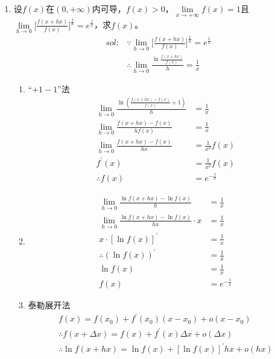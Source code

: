 \begin{enumerate}[{例}1.]
    \item 设$f(x)$在$(0,+\infty)$内可导，$f(x)>0$，$\lim\limits_{x\to{+\infty}}f(x)=1$且$\lim\limits_{h\to0}\bigg[\frac{f(x+hx)}{f(x)}\bigg]^\frac{1}{h}=e^\frac{1}{x}$，求$f(x)$。
        \begin{align*}
            sol:&\because \lim_{h \to 0}\bigg[\frac{f(x+hx)}{f(x)}\bigg]^{\frac{1}{h}}=e^{\frac{1}{x}}\\
            &\therefore \lim_{h \to 0}\frac{\ln \frac{f(x+hx)}{f(x)}}{h}=\frac{1}{x}
        \end{align*}
        \begin{enumerate}[$1^\circ$]
            \item ``$+1-1$''法
                \begin{align*}
                    \lim_{h \to 0}\frac{\ln(\frac{f(x+hx)-f(x)}{f(x)}+1)}{h}&=\frac{1}{x}\\
                    \lim_{h \to 0}\frac{f(x+hx)-f(x)}{hf(x)}&=\frac{1}{x}\\
                    \lim_{h \to 0}\frac{f(x+hx)-f(x)}{hx}&=\frac{1}{x^2}f(x)\\
                    f^{\prime}(x)&=\frac{1}{x^2}f(x)\\
                    \therefore f(x)&=e^{-\frac{1}{x}}
                \end{align*}
            \item 
                \begin{align*}
                    \lim_{h \to 0} \frac{\ln f(x+hx)-\ln f(x)}{h}&=\frac{1}{x}\\
                    \lim_{h \to 0} \frac{\ln f(x+hx)-\ln f(x)}{hx}\cdot x&=\frac{1}{x}\\
                    x\cdot[\ln f(x)]^{\prime}&=\frac{1}{x}\\
                    \therefore (\ln f(x))^{\prime}&=\frac{1}{x}\\
                    \ln f(x)&=\frac{1}{x}\\
                    f(x)&=e^{-\frac{1}{x}}
                \end{align*}
            \item 泰勒展开法
                \begin{align*}
                    f(x)=f(x_0)+f^{\prime}(x_0)(x-x_0)+o(x-x_0)\\
                    \therefore f(x+\Delta x)=f(x)+f^{\prime}(x)\Delta x+o(\Delta x)\\
                    \therefore \ln f(x+hx)=\ln f(x)+[\ln f(x)]^{\prime}hx+o(hx)\\

\end{align*}
\end{enumerate}
\end{enumerate}
